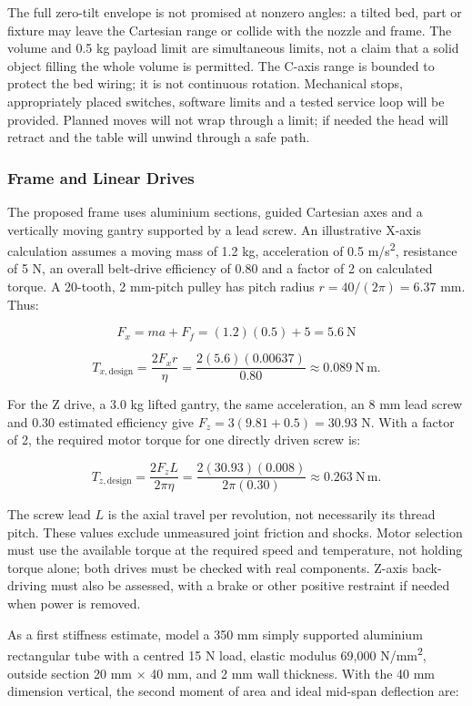 \documentclass[12pt,a4paper]{article}
\begin{document}
The full zero-tilt envelope is not promised at nonzero angles: a tilted bed, part or fixture may leave
  the Cartesian range or collide with the nozzle and frame. The volume and 0.5 kg payload limit are
  simultaneous limits, not a claim that a solid object filling the whole volume is permitted. The C-axis
  range is bounded to protect the bed wiring; it is not continuous rotation. Mechanical stops,
  appropriately placed switches, software limits and a tested service loop will be provided. Planned
  moves will not wrap through a limit; if needed the head will retract and the table will unwind through
  a safe path.

\subsubsection{Frame and Linear Drives}\label{frame-and-linear-drives}

The proposed frame uses aluminium sections, guided Cartesian axes and a vertically moving gantry
  supported by a lead screw. An illustrative X-axis calculation assumes a moving mass of 1.2 kg,
  acceleration of 0.5 m/s\textsuperscript{2}, resistance of 5 N, an overall belt-drive efficiency of 0.80
  and a factor of 2 on calculated torque. A 20-tooth, 2 mm-pitch pulley has pitch radius \(r = 40/(2\pi)
  = 6.37\) mm. Thus:

\[
F_x = ma + F_f = (1.2)(0.5) + 5 = 5.6\ \mathrm{N}
\]

\[
T_{x,\mathrm{design}} = \frac{2F_xr}{\eta} = \frac{2(5.6)(0.00637)}{0.80} \approx 0.089\ \mathrm{N\,m}.
\]

For the Z drive, a 3.0 kg lifted gantry, the same acceleration, an 8 mm lead screw and 0.30 estimated
  efficiency give \(F_z = 3(9.81 + 0.5) = 30.93\) N. With a factor of 2, the required motor torque for
  one directly driven screw is:

\[
T_{z,\mathrm{design}}=\frac{2F_z L}{2\pi\eta}=\frac{2(30.93)(0.008)}{2\pi(0.30)}\approx 0.263\
  \mathrm{N\,m}.
\]

The screw lead \(L\) is the axial travel per revolution, not necessarily its thread pitch. These values
  exclude unmeasured joint friction and shocks. Motor selection must use the available torque at the
  required speed and temperature, not holding torque alone; both drives must be checked with real
  components. Z-axis back-driving must also be assessed, with a brake or other positive restraint if
  needed when power is removed.

As a first stiffness estimate, model a 350 mm simply supported aluminium rectangular tube with a centred
  15 N load, elastic modulus 69,000 N/mm\textsuperscript{2}, outside section 20 mm \ensuremath{\times} 40
  mm, and 2 mm wall thickness. With the 40 mm dimension vertical, the second moment of area and ideal
  mid-span deflection are:
\end{document}
